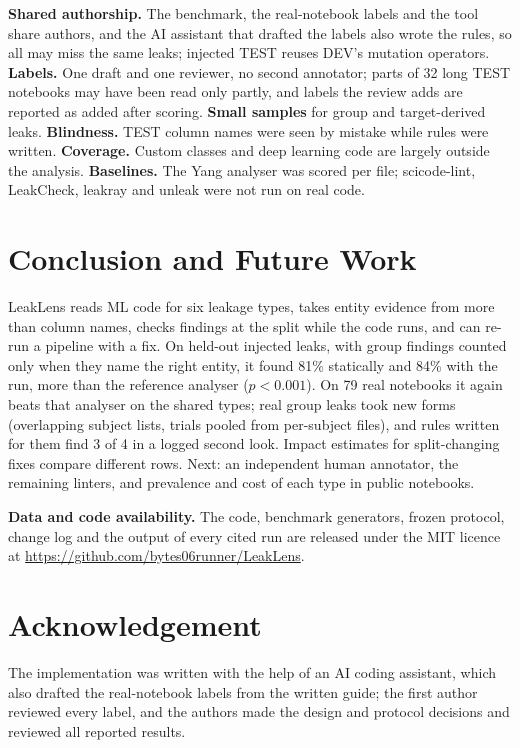 \documentclass[10pt,a4paper,twocolumn]{article}
\newcommand{\tool}{LeakLens}
\begin{document}
\textbf{Shared authorship.} The benchmark, the real-notebook labels and the tool share authors, and the AI assistant
that drafted the labels also wrote the rules, so all may miss the same leaks; injected TEST reuses DEV's mutation
operators. \textbf{Labels.} One draft and one reviewer, no second annotator; parts of 32 long TEST notebooks may
have been read only partly, and labels the review adds are reported as added after scoring. \textbf{Small samples} for group and target-derived leaks.
\textbf{Blindness.} TEST column names were seen by mistake while rules were written. \textbf{Coverage.} Custom
classes and deep learning code are largely outside the analysis. \textbf{Baselines.} The Yang analyser was scored per file;
scicode-lint, LeakCheck, leakray and unleak were not run on real code.

\section{Conclusion and Future Work}

\tool{} reads ML code for six leakage types, takes entity evidence from more than column names, checks findings at
the split while the code runs, and can re-run a pipeline with a fix. On held-out injected leaks, with group findings
counted only when they name the right entity, it found 81\% statically and 84\% with the run, more than the
reference analyser ($p<0.001$). On 79 real notebooks it again beats that analyser on the shared types; real group
leaks took new forms (overlapping subject lists, trials pooled from per-subject files), and rules written for them
find 3 of 4 in a logged second look. Impact estimates for split-changing fixes compare different rows. Next: an independent human annotator, the remaining linters, and prevalence and cost of each
type in public notebooks.

\textbf{Data and code availability.} The code, benchmark generators, frozen protocol, change log and the output of
every cited run are released under the MIT licence at \url{https://github.com/bytes06runner/LeakLens}.

\section*{Acknowledgement}

The implementation was written with the help of an AI coding assistant, which also drafted the real-notebook
labels from the written guide; the first author reviewed every label, and the authors made the design and
protocol decisions and reviewed all reported results.
\end{document}
